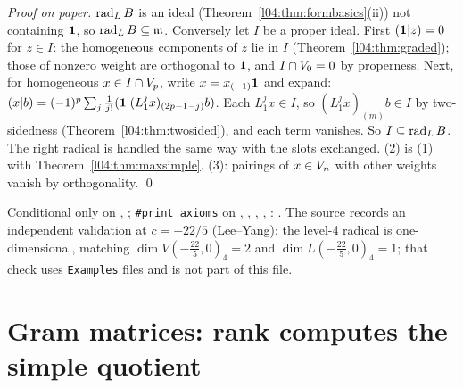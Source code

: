 \emph{Proof on paper.} $\operatorname{rad}_LB$ is an ideal (Theorem~\ref{l04:thm:formbasics}(ii)) not containing
$\mathbf{1}$, so $\operatorname{rad}_LB\subseteq\mathfrak{m}$. Conversely let $I$ be a proper ideal. First $(\mathbf{1}|z) = 0$ for $z\in I$:
the homogeneous components of $z$ lie in $I$ (Theorem~\ref{l04:thm:graded}); those of nonzero weight are
orthogonal to $\mathbf{1}$, and $I\cap V_0 = 0$ by properness. Next, for homogeneous $x\in I\cap V_p$, write
$x = x_{(-1)}\mathbf{1}$ and expand: $(x|b) = (-1)^p\sum_j\frac1{j!}(\mathbf{1}|(L_1^jx)_{(2p-1-j)}b)$. Each $L_1^jx\in I$,
so $(L_1^jx)_{(m)}b\in I$ by two-sidedness (Theorem~\ref{l04:thm:twosided}), and each term vanishes. So
$I\subseteq\operatorname{rad}_LB$. The right radical is handled the same way with the slots exchanged. (2) is (1) with
Theorem~\ref{l04:thm:maxsimple}. (3): pairings of $x\in V_n$ with other weights vanish by orthogonality. \qed
\begin{status}
Conditional only on , ; \texttt{\#print axioms} on \allowbreak{}\allowbreak{},
\allowbreak{}\allowbreak{}\allowbreak{}\allowbreak{}, \allowbreak{}\allowbreak{}\allowbreak{},
\allowbreak{}\allowbreak{}, \allowbreak{}\allowbreak{}\allowbreak{}:
. The source records an independent validation at
$c = -22/5$ (Lee--Yang): the level-4 radical is one-dimensional, matching $\dim V(-\frac{22}5,0)_4 = 2$ and
$\dim L(-\frac{22}5,0)_4 = 1$; that check uses \texttt{Examples} files and is not part of this file.
\end{status}

\section{Gram matrices: rank computes the simple quotient}\label{l04:sec:gram}

